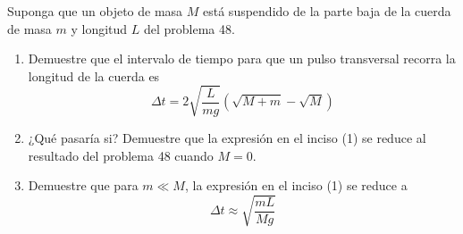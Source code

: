 \item Suponga que un objeto de masa $M$ está suspendido de la parte baja de la cuerda de masa $m$ y longitud $L$ del problema 48.
\begin{enumerate}
    \item Demuestre que el intervalo de tiempo para que un pulso transversal recorra la longitud de la cuerda es
$$ \Delta t = 2 \sqrt{\frac{L}{mg}} \left( \sqrt{M + m} - \sqrt{M} \right) $$
    \item ¿Qué pasaría si? Demuestre que la expresión en el inciso (1) se reduce al resultado del problema 48 cuando $M = 0$.
    \item Demuestre que para $m \ll M$, la expresión en el inciso (1) se reduce a
$$ \Delta t \approx \sqrt{\frac{mL}{Mg}} $$
\end{enumerate}